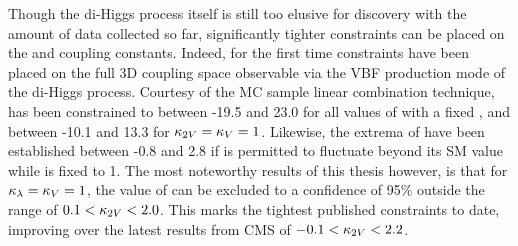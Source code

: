 Though the di-Higgs process itself is still too elusive for discovery with the amount of data collected so far,
    significantly tighter constraints can be placed on the \kvv and \kl coupling constants.
Indeed, for the first time constraints have been placed on the full
    3D coupling space observable via the VBF production mode of the di-Higgs process.
Courtesy of the MC sample linear combination technique,
    \kl has been constrained to between -19.5 and 23.0 for all values of \kvv with a fixed ,
    and between -10.1 and 13.3 for $\kappa_{2V}=\kappa_{V}=1$.
Likewise, the extrema of \kvv have been established between -0.8 and 2.8
    if \kl is permitted to fluctuate beyond its SM value while \kv is fixed to 1.
The most noteworthy results of this thesis however, is that for $\kappa_{\lambda}=\kappa_{V}=1$,
    the value of \kvv can be excluded to a confidence of 95\% outside the range of $0.1 < \kappa_{2V} < 2.0$.
This marks the tightest published constraints to date, improving over the latest results from CMS
    of $-0.1 < \kappa_{2V} < 2.2$\cite{cms_results}.

